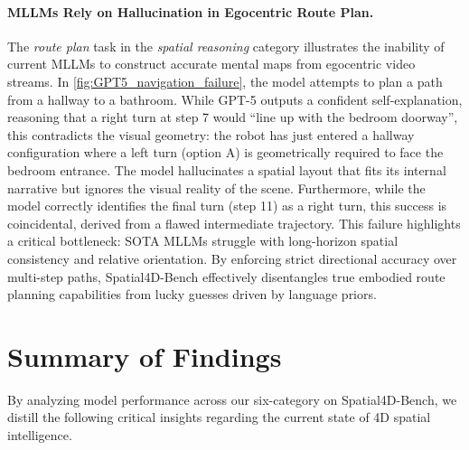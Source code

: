 \documentclass{article}
\begin{document}
\paragraph{MLLMs Rely on Hallucination in Egocentric Route Plan.}
The \textit{route plan} task in the \textit{spatial reasoning} category illustrates the inability of current MLLMs to construct accurate mental maps from egocentric video streams. 
In \cref{fig:GPT5_navigation_failure}, the model attempts to plan a path from a hallway to a bathroom. 
While GPT-5 outputs a confident self-explanation, reasoning that a right turn at step 7 would ``line up with the bedroom doorway'', this contradicts the visual geometry: the robot has just entered a hallway configuration where a left turn (option A) is geometrically required to face the bedroom entrance. 
The model hallucinates a spatial layout that fits its internal narrative but ignores the visual reality of the scene. 
Furthermore, while the model correctly identifies the final turn (step 11) as a right turn, this success is coincidental, derived from a flawed intermediate trajectory. 
This failure highlights a critical bottleneck: SOTA MLLMs struggle with long-horizon spatial consistency and relative orientation. 
By enforcing strict directional accuracy over multi-step paths, Spatial4D-Bench effectively disentangles true embodied route planning capabilities from lucky guesses driven by language priors.




\section{Summary of Findings}
\label{our_findings}

By analyzing model performance across our six-category on Spatial4D-Bench, we distill the following critical insights regarding the current state of 4D spatial intelligence.
\end{document}

